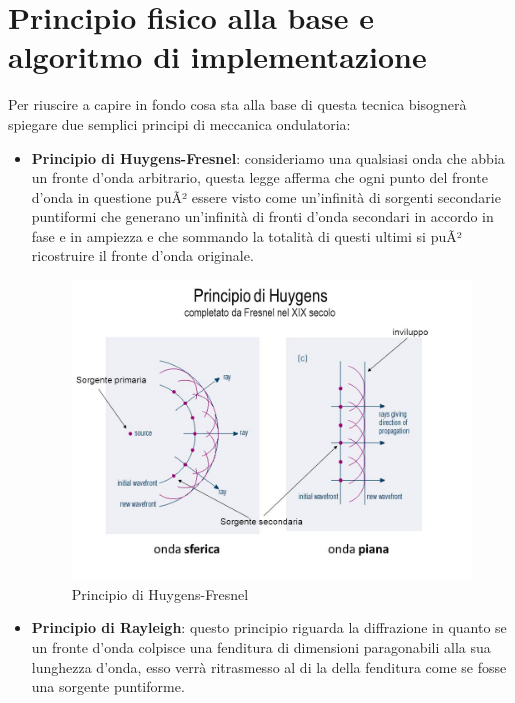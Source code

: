 \documentclass[12pt,a4paper]{report}
\begin{document}
\section{Principio fisico alla base e algoritmo di implementazione}

Per riuscire a capire in fondo cosa sta alla base di questa tecnica bisognerà spiegare due semplici principi di meccanica ondulatoria: 

\begin{itemize}

\item \textbf{Principio di Huygens-Fresnel}: consideriamo una qualsiasi onda che abbia un fronte d'onda arbitrario, questa legge afferma che ogni punto del fronte d'onda in questione puÃ² essere visto come un'infinità di sorgenti secondarie puntiformi che generano un'infinità di fronti d'onda secondari in accordo in fase e in ampiezza e che sommando la totalità di questi ultimi si puÃ² ricostruire il fronte d'onda originale.



\begin{figure}[htbp]
	\centering
	\includegraphics[scale=0.35]{figures/huygens.jpg}
	\caption {Principio di Huygens-Fresnel} 
	\label{fig:huygens}
	\end{figure}

\item \textbf{Principio di Rayleigh}: questo principio riguarda la diffrazione in quanto se un fronte d'onda colpisce una fenditura di dimensioni paragonabili alla sua lunghezza d'onda, esso verrà ritrasmesso al di la della fenditura come se fosse una sorgente puntiforme.

\end{itemize}
\end{document}
